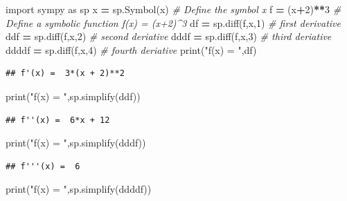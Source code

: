 \documentclass[
]{book}
\newenvironment{Shaded}{\begin{snugshade}}{\end{snugshade}}
\newcommand{\BuiltInTok}[1]{#1}
\newcommand{\CommentTok}[1]{\textcolor[rgb]{0.56,0.35,0.01}{\textit{#1}}}
\newcommand{\DecValTok}[1]{\textcolor[rgb]{0.00,0.00,0.81}{#1}}
\newcommand{\ImportTok}[1]{#1}
\newcommand{\NormalTok}[1]{#1}
\newcommand{\OperatorTok}[1]{\textcolor[rgb]{0.81,0.36,0.00}{\textbf{#1}}}
\newcommand{\StringTok}[1]{\textcolor[rgb]{0.31,0.60,0.02}{#1}}
\theoremstyle{definition}
\theoremstyle{definition}
\theoremstyle{definition}
\theoremstyle{remark}
\begin{document}
\begin{Shaded}
\begin{Highlighting}[]
\ImportTok{import}\NormalTok{ sympy }\ImportTok{as}\NormalTok{ sp }
\NormalTok{x }\OperatorTok{=}\NormalTok{ sp.Symbol(}\StringTok{\textquotesingle{}x\textquotesingle{}}\NormalTok{) }\CommentTok{\# Define the symbol x}
\NormalTok{f }\OperatorTok{=}\NormalTok{ (x}\OperatorTok{+}\DecValTok{2}\NormalTok{)}\OperatorTok{**}\DecValTok{3} \CommentTok{\# Define a symbolic function f(x) = (x+2)\^{}3}
\NormalTok{df }\OperatorTok{=}\NormalTok{ sp.diff(f,x,}\DecValTok{1}\NormalTok{) }\CommentTok{\# first derivative}
\NormalTok{ddf }\OperatorTok{=}\NormalTok{ sp.diff(f,x,}\DecValTok{2}\NormalTok{) }\CommentTok{\# second deriative}
\NormalTok{dddf }\OperatorTok{=}\NormalTok{ sp.diff(f,x,}\DecValTok{3}\NormalTok{) }\CommentTok{\# third deriative}
\NormalTok{ddddf }\OperatorTok{=}\NormalTok{ sp.diff(f,x,}\DecValTok{4}\NormalTok{) }\CommentTok{\# fourth deriative}
\BuiltInTok{print}\NormalTok{(}\StringTok{"f\textquotesingle{}(x) = "}\NormalTok{,df)}
\end{Highlighting}
\end{Shaded}

\begin{verbatim}
## f'(x) =  3*(x + 2)**2
\end{verbatim}

\begin{Shaded}
\begin{Highlighting}[]
\BuiltInTok{print}\NormalTok{(}\StringTok{"f\textquotesingle{}\textquotesingle{}(x) = "}\NormalTok{,sp.simplify(ddf))}
\end{Highlighting}
\end{Shaded}

\begin{verbatim}
## f''(x) =  6*x + 12
\end{verbatim}

\begin{Shaded}
\begin{Highlighting}[]
\BuiltInTok{print}\NormalTok{(}\StringTok{"f\textquotesingle{}\textquotesingle{}\textquotesingle{}(x) = "}\NormalTok{,sp.simplify(dddf))}
\end{Highlighting}
\end{Shaded}

\begin{verbatim}
## f'''(x) =  6
\end{verbatim}

\begin{Shaded}
\begin{Highlighting}[]
\BuiltInTok{print}\NormalTok{(}\StringTok{"f\textquotesingle{}\textquotesingle{}\textquotesingle{}\textquotesingle{}(x) = "}\NormalTok{,sp.simplify(ddddf))}
\end{Highlighting}
\end{Shaded}
\end{document}
